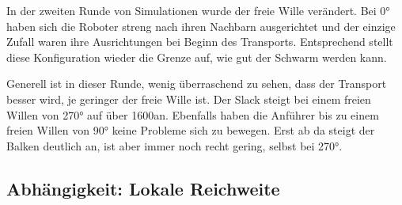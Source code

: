 In der zweiten Runde von Simulationen wurde der freie Wille verändert. Bei 0° haben sich die Roboter streng nach ihren Nachbarn ausgerichtet und der einzige Zufall waren ihre Ausrichtungen bei Beginn des Transports. Entsprechend stellt diese Konfiguration wieder die Grenze auf, wie gut der Schwarm werden kann.

Generell ist in dieser Runde, wenig überraschend zu sehen, dass der Transport besser wird, je geringer der freie Wille ist. Der Slack steigt bei einem freien Willen von 270° auf über 1600\per an. Ebenfalls haben die Anführer bis zu einem freien Willen von 90° keine Probleme sich zu bewegen. Erst ab da steigt der Balken deutlich an, ist aber immer noch recht gering, selbst bei 270°.

\subsection*{Abhängigkeit: Lokale Reichweite}

